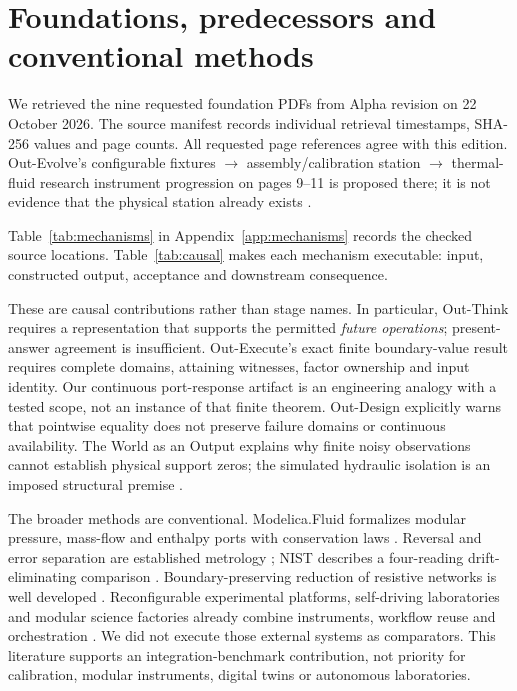 \documentclass[11pt,letterpaper]{article}
\newcommand{\code}[1]{\texttt{\small\seqsplit{#1}}}
\begin{document}
\section{Foundations, predecessors and conventional methods}
\label{sec:foundations}
We retrieved the nine requested foundation PDFs from Alpha revision \code{2b92933a5e3955440be770362acc18f06abf1708} on 22 October 2026. The source manifest records individual retrieval timestamps, SHA-256 values and page counts. All requested page references agree with this edition. Out-Evolve's configurable fixtures $\rightarrow$ assembly/calibration station $\rightarrow$ thermal-fluid research instrument progression on pages 9--11 is proposed there; it is not evidence that the physical station already exists \cite[\S\S4.1--4.5]{outevolve}.

Table~\ref{tab:mechanisms} in Appendix~\ref{app:mechanisms} records the checked source locations. Table~\ref{tab:causal} makes each mechanism executable: input, constructed output, acceptance and downstream consequence.

These are causal contributions rather than stage names. In particular, Out-Think requires a representation that supports the permitted \emph{future operations}; present-answer agreement is insufficient. Out-Execute's exact finite boundary-value result requires complete domains, attaining witnesses, factor ownership and input identity. Our continuous port-response artifact is an engineering analogy with a tested scope, not an instance of that finite theorem. Out-Design explicitly warns that pointwise equality does not preserve failure domains or continuous availability. The World as an Output explains why finite noisy observations cannot establish physical support zeros; the simulated hydraulic isolation is an imposed structural premise \cite{outthink,outexecute,outdesign,world}.

The broader methods are conventional. Modelica.Fluid formalizes modular pressure, mass-flow and enthalpy ports with conservation laws \cite{franke2009}. Reversal and error separation are established metrology \cite{evans1996}; NIST describes a four-reading drift-eliminating comparison \cite{nistdrift}. Boundary-preserving reduction of resistive networks is well developed \cite{kron2013}. Reconfigurable experimental platforms, self-driving laboratories and modular science factories already combine instruments, workflow reuse and orchestration \cite{bedard2018,macleod2020,vescovi2023,chemos2024}. We did not execute those external systems as comparators. This literature supports an integration-benchmark contribution, not priority for calibration, modular instruments, digital twins or autonomous laboratories.
\end{document}
